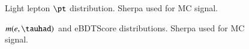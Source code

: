 \begin{figure}[h!tbp]
	\centering
	\hfill
	\caption{Light lepton $\pt$ distribution. Sherpa used for MC signal.}
	\label{AFig14S}
\end{figure} 

\begin{figure}[h!tbp]
	\centering
	\hfill
	\caption{$m(e,\tauhad)$ and eBDTScore distributions. Sherpa used for MC signal.}
\label{AFig7S}
\end{figure} 

